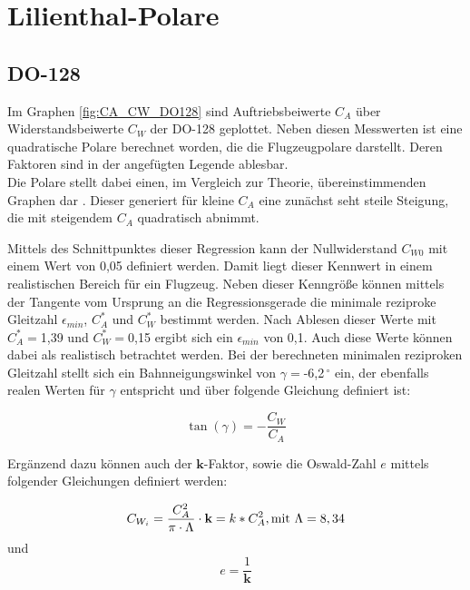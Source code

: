 \section{Lilienthal-Polare}

\subsection{DO-128}

Im Graphen \ref{fig:CA_CW_DO128} sind  Auftriebsbeiwerte $C_A$ über Widerstandsbeiwerte $C_W$ der DO-128 geplottet. Neben diesen Messwerten ist eine quadratische Polare berechnet worden, die die Flugzeugpolare darstellt. Deren Faktoren sind in der angefügten Legende ablesbar. \\ Die Polare stellt dabei einen, im Vergleich zur Theorie, übereinstimmenden Graphen dar \cite{Kurzskript}. Dieser generiert für kleine $C_A$ eine zunächst seht steile Steigung, die mit steigendem $C_A$ quadratisch abnimmt. 

Mittels des Schnittpunktes dieser Regression kann der Nullwiderstand $C_{W0}$ mit einem Wert von 0,05 definiert werden. Damit liegt dieser Kennwert in einem realistischen Bereich für ein Flugzeug. Neben dieser Kenngröße können mittels der Tangente vom Ursprung an die Regressionsgerade die minimale reziproke Gleitzahl $\epsilon_{min}$, $C_A^*$ und $C_W^*$ bestimmt werden. Nach Ablesen dieser Werte mit $C_A^*=$1,39 und $C_W^*=$0,15 ergibt sich ein $\epsilon_{min}$ von 0,1. Auch diese Werte können dabei als realistisch betrachtet werden. Bei der berechneten minimalen reziproken Gleitzahl stellt sich ein Bahnneigungswinkel von $\gamma=$-6,2$^{\ \circ}$ ein, der ebenfalls realen Werten für $\gamma$ entspricht und über folgende Gleichung definiert ist:

\begin{equation}
\tan\left(\gamma\right)=-\frac{C_W}{C_A}
\end{equation}

Ergänzend dazu können auch der $\textbf{k}$-Faktor, sowie die Oswald-Zahl $e$ mittels folgender Gleichungen definiert werden:

\begin{equation}
C_{W_{i}}=\frac{C_A^2}{\pi \cdot \Lambda}\cdot \textbf{k}=k*C_A^2, \\ \mathrm{mit} \ \Lambda=8,34 
\label{eq:C_W_i}
\end{equation}
und
\begin{equation}
e=\frac{1}{\textbf{k}}
\end{equation}

